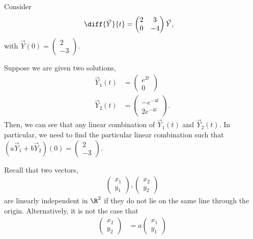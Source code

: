 \documentclass[10pt]{mypackage}
\begin{document}
\begin{example}
  Consider
  \begin{align*}
    \diff{\vec{Y}}{t} &= \begin{pmatrix}2 & 3 \\ 0 & -4\end{pmatrix} \vec{Y},
  \end{align*}
  with $\vec{Y}(0) = \begin{pmatrix}2\\-3\end{pmatrix}$.\newline

  Suppose we are given two solutions, 
  \begin{align*}
    \vec{Y}_1(t) &= \begin{pmatrix}e^{2t}\\0\end{pmatrix}\\
    \vec{Y}_2(t) &= \begin{pmatrix}-e^{-4t}\\2e^{-4t}\end{pmatrix}.
  \end{align*}
  Then, we can see that any linear combination of $\vec{Y}_1(t)$ and $\vec{Y}_2(t)$. In particular, we need to find the particular linear combination such that $\left(a\vec{Y}_1 + b\vec{Y}_2\right)(0) = \begin{pmatrix}2\\-3\end{pmatrix} $.
\begin{recall}
  Recall that two vectors,
  \begin{align*}
    \begin{pmatrix}x_1\\y_1\end{pmatrix}, \begin{pmatrix}x_2\\y_2\end{pmatrix}
  \end{align*}
  are linearly independent in $\R^2$ if they do not lie on the same line through the origin. Alternatively, it is not the case that
  \begin{align*}
    \begin{pmatrix}x_2\\y_2\end{pmatrix} &= a \begin{pmatrix}x_1\\y_1\end{pmatrix}
  \end{align*}

\end{recall}
\end{example}
\end{document}
